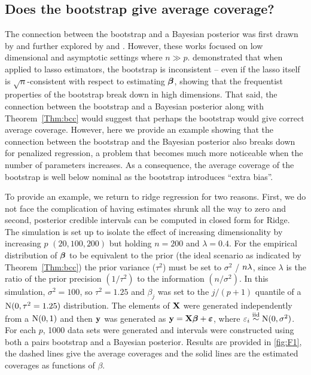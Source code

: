 \subsection{Does the bootstrap give average coverage?}
\label{Sec:boot-bias}

The connection between the bootstrap and a Bayesian posterior was first drawn by \cite{Rubin1981} and further explored by \cite{efron1982} and \cite{Lo1987}. However, these works focused on low dimensional and asymptotic settings where $n \gg p$. \cite{Chatterjee2010} demonstrated that when applied to lasso estimators, the bootstrap is inconsistent -- even if the lasso itself is $\sqrt{n}$-consistent with respect to estimating $\boldsymbol{\beta}$, showing that the frequentist properties of the bootstrap break down in high dimensions. That said, the connection between the bootstrap and a Bayesian posterior along with Theorem~\ref{Thm:bcc} would suggest that perhaps the bootstrap would give correct average coverage. However, here we provide an example showing that the connection between the bootstrap and the Bayesian posterior also breaks down for penalized regression, a problem that becomes much more noticeable when the number of parameters increases. As a consequence, the average coverage of the bootstrap is well below nominal as the bootstrap introduces ``extra bias''.

To provide an example, we return to ridge regression for two reasons. First, we do not face the complication of having estimates shrunk all the way to zero and second, posterior credible intervals can be computed in closed form for Ridge. The simulation is set up to isolate the effect of increasing dimensionality by increasing $p$ $(20, 100, 200)$ but holding $n = 200$ and $\lambda = 0.4$. For the empirical distribution of $\boldsymbol{\beta}$ to be equivalent to the prior (the ideal scenario as indicated by Theorem~\ref{Thm:bcc}) the prior variance ($\tau^2$) must be set to $\sigma^2$ / $n\lambda$, since $\lambda$ is the ratio of the prior precision $(1/\tau^2)$ to the information $(n / \sigma^2)$. In this simulation, $\sigma^2 = 100$, so $\tau^2 = 1.25$ and $\beta_j$ was set to the $j/(p+1)$ quantile of a $\textrm{N}(0,\tau^2=1.25)$ distribution. The elements of $\mathbf{X}$ were generated independently from a $\textrm{N}(0, 1)$ and then $\mathbf{y}$ was generated as $\mathbf{y} = \mathbf{X}\boldsymbol{\beta} + \boldsymbol{\varepsilon}$, where $\varepsilon_i \overset{\text{iid}}{\sim} \textrm{N}(0, \sigma^2)$. For each $p$, 1000 data sets were generated and intervals were constructed using both a pairs bootstrap and a Bayesian posterior. Results are provided in \ref{fig:F1}, the dashed lines give the average coverages and the solid lines are the estimated coverages as functions of $\beta$.

